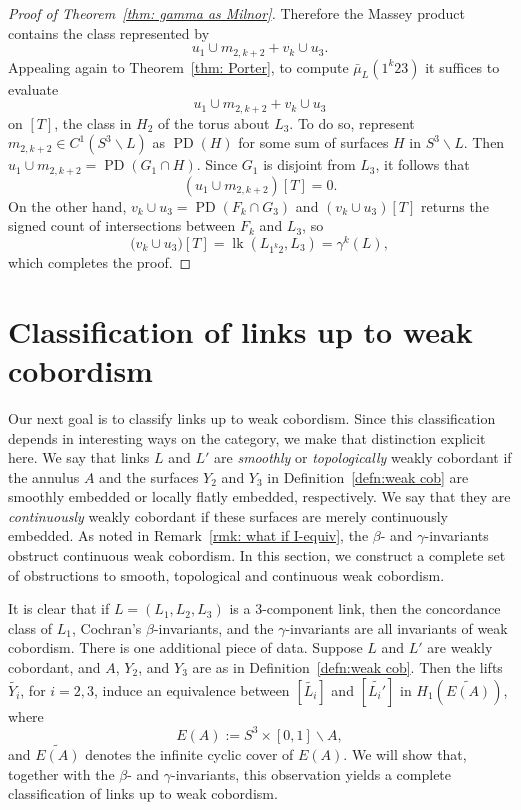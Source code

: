 \documentclass[a4paper, 11pt]{amsart}
\theoremstyle{definition}
\newcommand{\lk}{\operatorname{lk}}
\newcommand{\PD}{\operatorname{PD}}
\begin{document}
\begin{proof}[Proof of Theorem~\ref{thm: gamma as Milnor}]
Therefore the Massey product contains the class represented by
\[
u_1\cup m_{2,k+2}+v_k\cup u_3.
\]
Appealing again to Theorem~\ref{thm: Porter}, to compute $\bar{\mu}_L(1^k23)$ it suffices to evaluate
\[
u_1\cup m_{2,k+2}+v_k\cup u_3
\]
on $[T]$, the class in $H_2$ of the torus about $L_3$.
To do so, represent $m_{2,k+2}\in C^1(S^3\smallsetminus L)$ as $\PD(H)$ for some sum of surfaces $H$ in $S^3\smallsetminus L$.
Then $u_1\cup m_{2,k+2}=\PD(G_1\cap H)$. Since $G_1$ is disjoint from $L_3$, it follows that
\[
(u_1\cup m_{2,k+2})[T]=0.
\]
On the other hand, $v_k\cup u_3 = \PD(F_k\cap G_3)$ and $(v_k\cup u_3)[T]$ returns the signed count of intersections between $F_k$ and $L_3$, so
\[
\bigl(v_k\cup u_3\bigr)[T]= \lk(L_{1^k2},L_3)=\gamma^k(L),
\]
which completes the proof.
\end{proof}





\section{Classification of links up to weak cobordism}\label{sect: classify}

Our next goal is to classify links up to weak cobordism. Since this classification depends in interesting ways on the category, we make that distinction explicit here. We say that links $L$ and $L'$ are \emph{smoothly} or \emph{topologically} weakly cobordant if the annulus $A$ and the surfaces $Y_2$ and $Y_3$ in Definition~\ref{defn:weak cob} are smoothly embedded or locally flatly embedded, respectively. We say that they are \emph{continuously} weakly cobordant if these surfaces are merely continuously embedded. As noted in Remark~\ref{rmk: what if I-equiv}, the $\beta$- and $\gamma$-invariants obstruct continuous weak cobordism. In this section, we construct a complete set of obstructions to smooth, topological and continuous weak cobordism.

It is clear that if $L=(L_1,L_2,L_3)$ is a $3$-component link, then the concordance class of $L_1$, Cochran's $\beta$-invariants, and the $\gamma$-invariants are all invariants of weak cobordism. There is one additional piece of data. Suppose $L$ and $L'$ are weakly cobordant, and $A$, $Y_2$, and $Y_3$ are as in Definition~\ref{defn:weak cob}. Then the lifts $\widetilde{Y_i}$, for $i=2,3$, induce an equivalence between
$[\widetilde{L_i}]$ and $[\widetilde{L_i'}]$ in $H_1(\widetilde{E(A)})$, where
\[
E(A):=S^3\times[0,1]\smallsetminus A,
\]
and $\widetilde{E(A)}$ denotes the infinite cyclic cover of $E(A)$. We will show that, together with the $\beta$- and $\gamma$-invariants, this observation yields a complete classification of links up to weak cobordism.
\end{document}
